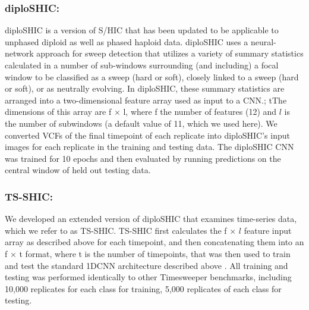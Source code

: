 \subsubsection{diploSHIC: } diploSHIC \cite{kernDiploSHICUpdated2018} is a version of S/HIC \cite{schriderHICRobustIdentification2016} that has been updated to be applicable to unphased diploid as well as phased haploid data. diploSHIC uses a neural-network approach for sweep detection that utilizes a variety of summary statistics calculated in a number of sub-windows surrounding (and including) a focal window to be classified as a sweep (hard or soft), closely linked to a sweep (hard or soft), or as neutrally evolving. In diploSHIC, these summary statistics are arranged into a two-dimensional feature array used as input to a CNN.; tThe dimensions of this array are f × l, where f the number of features (12) and $l$ is the number of subwindows (a default value of 11, which we used here). We converted VCFs of the final timepoint of each replicate into diploSHIC’s input images for each replicate in the training and testing data. The diploSHIC CNN was trained for 10 epochs and then evaluated by running predictions on the central window of held out testing data.

\subsubsection{TS-SHIC: } We developed an extended version of diploSHIC that examines time-series data, which we refer to as TS-SHIC. TS-SHIC first calculates the f × $l$ feature input array as described above for each timepoint, and then concatenating them into an f × t format, where t is the number of timepoints, that was then used to train and test the standard 1DCNN architecture described above . All training and testing was performed identically to other Timesweeper benchmarks, including 10,000 replicates for each class for training, 5,000 replicates of each class for testing. \\
 
